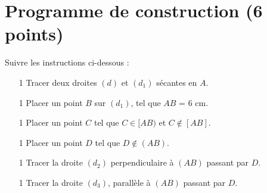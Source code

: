 \section{Programme de construction (6 points)}

\begin{questions}
	\question Suivre les instructions ci-dessous :
	
	\begin{enumerate}[label=\arabic*)]
		\item[1] Tracer deux droites $(d)$ et $(d_1)$ sécantes en $A$.
		\item[1] Placer un point $B$ sur $(d_1)$, tel que $AB$ = 6 cm.
		\item[1] Placer un point $C$ tel que $C \in [AB)$ et $C \notin [AB] $.
		\item[1] Placer un point $D$ tel que $D \notin (AB)$.
		\item[1] Tracer la droite $(d_2)$ perpendiculaire à $(AB)$ passant par $D$.
		\item[1] Tracer la droite $(d_3)$, parallèle à $(AB)$ passant par $D$.
	\end{enumerate}
\end{questions}